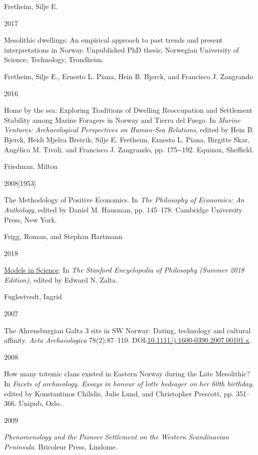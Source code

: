 \documentclass[
  12pt,
  a4paper,
  oneside]{book}
\newlength{\cslhangindent}
\newlength{\csllabelwidth}
\newlength{\cslentryspacingunit} %
\newenvironment{CSLReferences}[2] %
 {%
  \setlength{\parindent}{0pt}
  \ifodd #1
  \let\oldpar\par
  \def\par{\hangindent=\cslhangindent\oldpar}
  \fi
  \setlength{\parskip}{#2\cslentryspacingunit}
 }%
 {}
\newcommand{\CSLBlock}[1]{#1\hfill\break}
\newcommand{\CSLLeftMargin}[1]{\parbox[t]{\csllabelwidth}{#1}}
\newcommand{\CSLRightInline}[1]{\parbox[t]{\linewidth - \csllabelwidth}{#1}\break}
\begin{document}
\begin{CSLReferences}{0}{0}
\leavevmode{}%
\CSLBlock{Fretheim, Silje E.}
\CSLLeftMargin{ 2017}%
\CSLRightInline{{Mesolithic dwellings: An empirical approach to past trends and present interpretations in Norway}. Unpublished PhD thesis, Norwegian University of Science; Technology, Trondheim.}

\leavevmode{}%
\CSLBlock{Fretheim, Silje E., Ernesto L. Piana, Hein B. Bjerck, and Francisco J. Zangrando}
\CSLLeftMargin{ 2016}%
\CSLRightInline{{Home by the sea: Exploring Traditions of Dwelling Reoccupation and Settlement Stability among Marine Foragers in Norway and Tierra del Fuego}. In \emph{{Marine Ventures: Archaeological Perspectives on Human-Sea Relations}}, edited by Hein B. Bjerck, Heidi Mjelva Breivik, Silje E. Fretheim, Ernesto L. Piana, Birgitte Skar, Angélica M. Tivoli, and Francisco J. Zangrando, pp. 175-\/-192. Equinox, Sheffield.}

\leavevmode{}%
\CSLBlock{Friedman, Milton}
\CSLLeftMargin{ 2008{[}1953{]}}%
\CSLRightInline{{The Methodology of Positive Economics}. In \emph{{The Philosophy of Economics: An Anthology}}, edited by Daniel M. Hausman, pp. 145--178. Cambridge University Press, New York.}

\leavevmode{}%
\CSLBlock{Frigg, Roman, and Stephan Hartmann}
\CSLLeftMargin{ 2018}%
\CSLRightInline{\href{https://plato.stanford.edu/archives/sum2018/entries/models-science/}{{Models in Science}}. In \emph{{The Stanford Encyclopedia of Philosophy (Summer 2018 Edition)}}, edited by Edward N. Zalta.}

\leavevmode{}%
\CSLBlock{Fuglestvedt, Ingrid}
\CSLLeftMargin{ 2007}%
\CSLRightInline{{The Ahrensburgian Galta 3 site in SW Norway: Dating, technology and cultural affinity}. \emph{Acta Archaeologica} 78(2):87--110. DOI:\href{https://doi.org/10.1111/j.1600-0390.2007.00101.x}{10.1111/j.1600-0390.2007.00101.x}.}

\leavevmode{}%
\CSLLeftMargin{ 2008 }%
\CSLRightInline{{How many totemic clans existed in Eastern Norway during the Late Mesolithic?} In \emph{Facets of archaeology. Essays in honour of lotte hedeager on her 60th birthday}, edited by Konstantinos Chilidis, Julie Lund, and Christopher Prescott, pp. 351--366. Unipub, Oslo.}

\leavevmode{}%
\CSLLeftMargin{ 2009 }%
\CSLRightInline{\emph{{Phenomenology and the Pioneer Settlement on the Western Scandinavian Peninsula}}. Bricoleur Press, Lindome.}


\end{CSLReferences}
\end{document}

